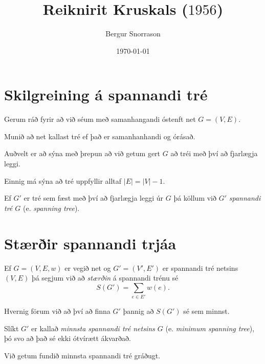 \title{Reiknirit Kruskals ($1956$)}
\author{Bergur Snorrason}
\date{\today}



\frame{\titlepage}

\section{Skilgreining á spannandi tré}
{
    {
        \item<1-> Gerum ráð fyrir að við séum með samanhangandi óstenft net $G = (V, E)$.
        \item<2-> Munið að net kallast tré ef það er samanhanhandi og órásað.
        \item<3-> Auðvelt er að sýna með þrepun að við getum gert $G$ að tréi með því að fjarlægja leggi.
        \item<4-> Einnig má sýna að tré uppfyllir alltaf $|E| = |V| - 1$.
        \item<5-> Ef $G'$ er tré sem fæst með því að fjarlægja leggi úr $G$ þá köllum við $G'$ \emph{spannandi tré $G$} (e. \emph{spanning tree}).
    }
}

\section{Stærðir spannandi trjáa}
{
    {
        \item<1-> Ef $G = (V, E, w)$ er vegið net og $G' = (V', E')$ er spannandi tré netsins $(V, E)$ þá segjum við að \emph{stærðin}
                    á spannandi trénu sé
            \[
            S(G') = \sum_{e \in E'} w(e).
                \]
        \item<2-> Hvernig förum við að því að finna $G'$ þannig að $S(G')$ sé sem minnst.
        \item<3-> Slíkt $G'$ er kallað \emph{minnsta spannandi tré netsins $G$} (e. \emph{minimum spanning tree}),
            þó svo að það sé ekki ótvírætt ákvarðað.
        \item<4-> Við getum fundið minnsta spannandi tré gráðugt.
    }
}

